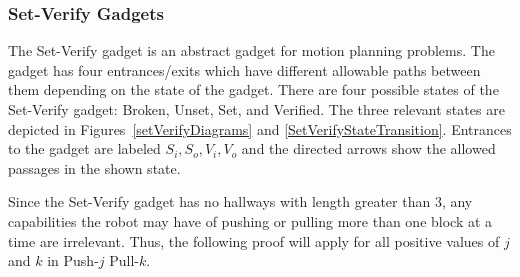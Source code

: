 \subsubsection{Set-Verify Gadgets}
\label{sec:SetVerifyGadgets}
The Set-Verify gadget is an abstract gadget for motion planning problems. The gadget has four entrances/exits which have different allowable paths between them depending on the state of the gadget. There are four possible states of the Set-Verify gadget: Broken, Unset, Set, and Verified. The three relevant states are depicted in Figures~\ref{setVerifyDiagrams} and \ref{SetVerifyStateTransition}. Entrances to the gadget are labeled $S_i, S_o, V_i, V_o$ and the directed arrows show the allowed passages in the shown state.
%

Since the Set-Verify gadget has no hallways with length greater than $3$, any capabilities the robot may have of pushing or pulling more than one block at a time are irrelevant. Thus, the following proof will apply for all positive values of $j$ and $k$ in Push-$j$ Pull-$k$.

